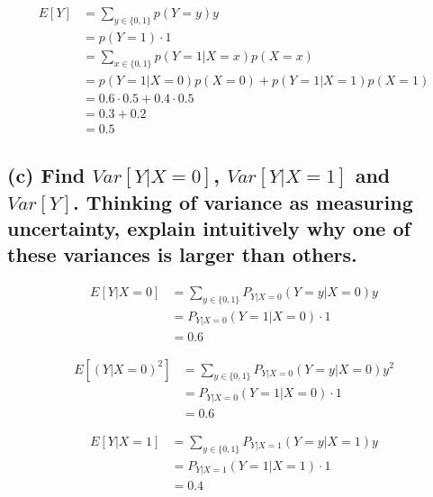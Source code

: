 \documentclass[
  letterpaper,
  DIV=11,
  numbers=noendperiod]{scrreprt}
\begin{document}
\[
\begin{aligned}
    E[Y] &= \sum_{y\in \{0,1\}} p(Y=y)y\\
         &= p(Y=1)\cdot 1\\ 
         &= \sum_{x\in\{0,1\}} p(Y=1 | X=x)p(X=x)\\
         &= p(Y=1|X=0)p(X=0) + p(Y=1|X=1)p(X=1)\\ 
         &= 0.6\cdot 0.5 + 0.4 \cdot 0.5 \\ 
         &= 0.3 + 0.2 \\ 
         &= 0.5
\end{aligned}
\]

\hypertarget{c-find-varyx0-varyx1-and-vary.-thinking-of-variance-as-measuring-uncertainty-explain-intuitively-why-one-of-these-variances-is-larger-than-others.}{%
\subsection{\texorpdfstring{(c) Find \(Var[Y|X=0]\), \(Var[Y|X=1]\) and
\(Var[Y]\). Thinking of variance as measuring uncertainty, explain
intuitively why one of these variances is larger than
others.}{(c) Find Var{[}Y\textbar X=0{]}, Var{[}Y\textbar X=1{]} and Var{[}Y{]}. Thinking of variance as measuring uncertainty, explain intuitively why one of these variances is larger than others.}}\label{c-find-varyx0-varyx1-and-vary.-thinking-of-variance-as-measuring-uncertainty-explain-intuitively-why-one-of-these-variances-is-larger-than-others.}}

\[
\begin{aligned}
    E[Y|X=0] &= \sum_{y \in\{0,1\}} P_{Y|X=0}(Y=y|X=0)y\\
             &= P_{Y|X=0}(Y=1|X=0)\cdot 1 \\ 
             &= 0.6
\end{aligned}
\]

\[
\begin{aligned}
    E[(Y|X=0)^2] &= \sum_{y \in\{0,1\}} P_{Y|X=0}(Y=y|X=0)y^2\\
             &= P_{Y|X=0}(Y=1|X=0)\cdot 1 \\ 
             &= 0.6
\end{aligned}
\]

\[
\begin{aligned}
    E[Y|X=1] &= \sum_{y \in\{0,1\}} P_{Y|X=1}(Y=y|X=1)y\\
             &= P_{Y|X=1}(Y=1|X=1)\cdot 1 \\ 
             &= 0.4
\end{aligned}
\]
\end{document}
